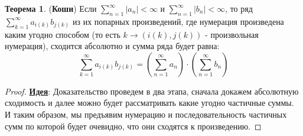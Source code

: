 \documentclass[12pt]{article}
\theoremstyle{definition}
\newtheorem{theorem}{Теорема}
\DeclareMathOperator*{\dsum}{\displaystyle\sum}
\begin{document}
\begin{theorem}(\textbf{Коши})
	Если $\dsum\limits_{n = 1}^{\infty} |a_n| < \infty$ и $\dsum\limits_{n = 1}^{\infty} |b_n| < \infty$, то ряд $\dsum\limits_{k = 1}^{\infty} a_{i(k)}b_{j(k)}$ из их попарных произведений, где нумерация произведена каким угодно способом (то есть $k \to \left(i(k),j(k)\right)$ - произвольная нумерация), сходится абсолютно и сумма ряда будет равна:
	$$
		\dsum\limits_{k = 1 }^{\infty} a_{i(k)}b_{j(k)} = \left(\dsum\limits_{n = 1}^{\infty} a_n \right) {\cdot} \left(\dsum\limits_{n = 1}^{\infty} b_n \right)
	$$
\end{theorem}
\begin{proof}
	\textbf{\uline{Идея}}: Доказательство проведем в два этапа, сначала докажем абсолютную сходимость и далее можно будет рассматривать какие угодно частичные суммы. И таким образом, мы предъявим нумерацию и последовательность частичных сумм по которой будет очевидно, что они сходятся к произведению.
	

\end{proof}
\end{document}
